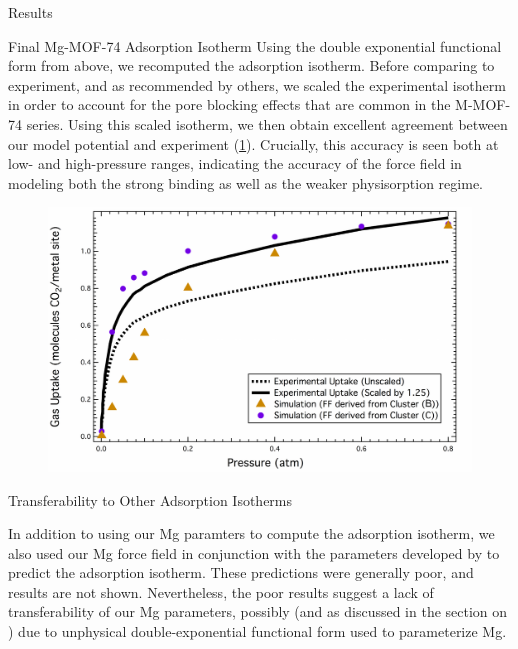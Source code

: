 \begin{section}{Results}
\begin{subsection}{Final Mg-MOF-74 {\co} Adsorption Isotherm}
Using the double exponential functional form from above, we recomputed the
\mgmof \co adsorption isotherm. Before comparing to experiment, and as
recommended by others,\cite{Haldoupis2015a} we scaled the experimental
isotherm in order to account for the pore blocking effects that are common in
the M-MOF-74 series. Using this scaled isotherm, we then obtain excellent
agreement between our model potential and experiment
(\cref{fig:lmoeda-isotherm}). Crucially, this accuracy is seen both at low-
and high-pressure ranges, indicating the accuracy of the force field in
modeling both the
strong  binding as well as the weaker physisorption regime.



    \begin{figure}
    \centering
    \includegraphics[width=1.0\textwidth]{lmoeda/mgmof_isotherm.pdf}
    \caption[Model clusters for \mgmof]
{
            }
    \label{fig:lmoeda-isotherm}
    \end{figure}

\end{subsection}
\begin{subsection}{Transferability to Other Adsorption Isotherms}

In addition to using our Mg paramters to compute the \co adsorption isotherm,
we also used our Mg force field in conjunction with the  parameters
developed by \citeauthor{Yu2011}\cite{Yu2011} to predict the 
adsorption isotherm. These predictions were generally poor, and results are
not shown. Nevertheless, the poor  results suggest a lack of
transferability of our Mg parameters, possibly (and as discussed in the
section on ) due to unphysical double-exponential
functional form used to parameterize Mg.


\end{subsection}
\end{section}
